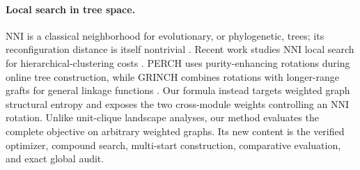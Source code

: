 \paragraph{Local search in tree space.}
NNI is a classical neighborhood for evolutionary, or phylogenetic, trees; its
reconfiguration distance is itself nontrivial \cite{litrompzhang1996}. Recent
work studies NNI local search for hierarchical-clustering costs
\cite{jowhari2024}. PERCH uses purity-enhancing rotations during online tree
construction, while GRINCH combines rotations with longer-range grafts for
general linkage functions \cite{kobren2017perch,monath2019grinch}. Our formula
instead targets weighted graph structural entropy and exposes the two
cross-module weights controlling an NNI rotation. Unlike unit-clique landscape
analyses, our method evaluates the complete objective on arbitrary weighted
graphs. Its new content is the verified optimizer, compound search, multi-start
construction, comparative evaluation, and exact global audit.
